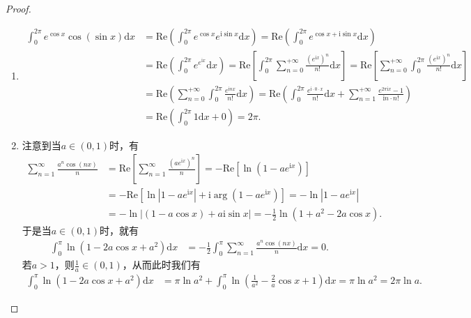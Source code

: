 \documentclass[../../main.tex]{subfiles}
\begin{document}
\begin{proof}
\begin{enumerate}
\item \begin{align*}
\int_0^{2\pi}{e^{\cos x}\cos \left( \sin x \right) \mathrm{d}x}&=\mathrm{Re}\left( \int_0^{2\pi}{e^{\cos x}e^{\mathrm{i}\sin x}\mathrm{d}x} \right) =\mathrm{Re}\left( \int_0^{2\pi}{e^{\cos x+\mathrm{i}\sin x}\mathrm{d}x} \right) 
\\
&=\mathrm{Re}\left( \int_0^{2\pi}{e^{e^{\mathrm{i}x}}\mathrm{d}x} \right) =\mathrm{Re}\left[ \int_0^{2\pi}{\sum_{n=0}^{+\infty}{\frac{\left( e^{\mathrm{i}x} \right) ^n}{n!}}\mathrm{d}x} \right] =\mathrm{Re}\left[ \sum_{n=0}^{+\infty}{\int_0^{2\pi}{\frac{\left( e^{\mathrm{i}x} \right) ^n}{n!}\mathrm{d}x}} \right] 
\\
&=\mathrm{Re}\left( \sum_{n=0}^{+\infty}{\int_0^{2\pi}{\frac{e^{\mathrm{i}nx}}{n!}\mathrm{d}x}} \right) =\mathrm{Re}\left( \int_0^{2\pi}{\frac{e^{\mathrm{i}\cdot 0\cdot x}}{n!}\mathrm{d}x}+\sum_{n=1}^{+\infty}{\frac{e^{2\pi \mathrm{i}x}-1}{\mathrm{i}n\cdot n!}} \right) 
\\
&=\mathrm{Re}\left( \int_0^{2\pi}{1\mathrm{d}x}+0 \right) =2\pi .
\end{align*}

\item 注意到当\(a\in(0,1)\)时，有
\begin{align*}
\sum_{n = 1}^{\infty} \frac{a^n\cos(nx)}{n} &= \mathrm{Re}\left[ \sum_{n = 1}^{\infty} \frac{(ae^{\mathrm{i}x})^n}{n} \right] = -\mathrm{Re}\left[ \ln(1 - ae^{\mathrm{i}x}) \right] \\
&= -\mathrm{Re}\left[ \ln|1 - ae^{\mathrm{i}x}| + \mathrm{i} \arg(1 - ae^{\mathrm{i}x}) \right] = -\ln|1 - ae^{\mathrm{i}x}| \\
&= -\ln|(1 - a\cos x) + a\mathrm{i}\sin x| = -\frac{1}{2}\ln(1 + a^2 - 2a\cos x).
\end{align*}
于是当\(a\in(0,1)\)时，就有
\begin{align*}
\int_0^{\pi} \ln(1 - 2a\cos x + a^2) \mathrm{d}x &= -\frac{1}{2}\int_0^{\pi} \sum_{n = 1}^{\infty} \frac{a^n\cos(nx)}{n} \mathrm{d}x = 0.
\end{align*}
若\(a > 1\)，则\(\frac{1}{a}\in(0,1)\)，从而此时我们有
\begin{align*}
\int_0^{\pi} \ln(1 - 2a\cos x + a^2) \mathrm{d}x &= \pi \ln a^2 + \int_0^{\pi} \ln\left( \frac{1}{a^2} - \frac{2}{a}\cos x + 1 \right) \mathrm{d}x = \pi \ln a^2 = 2\pi \ln a.
\end{align*}


\end{enumerate}
\end{proof}
\end{document}
